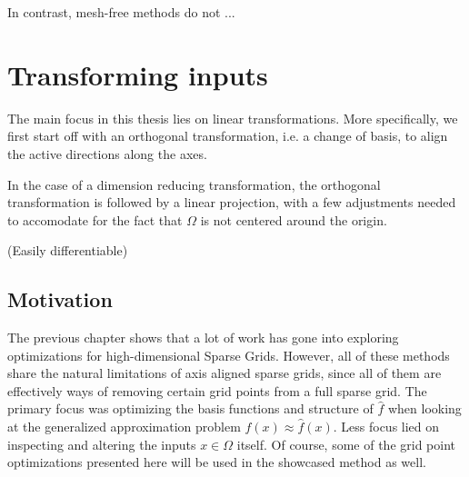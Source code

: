 \documentclass[
  a4paper,  %
  twoside,  %
  bibliography=totoc,
  headsepline,
  cleardoublepage=empty,
  parskip=half,
  draft=false
]{scrbook}
\begin{document}
In contrast, mesh-free methods do not ...







\chapter{Transforming inputs}

The main focus in this thesis lies on linear transformations.
More specifically, we first start off with an orthogonal transformation, i.e. a change of basis, to align the active directions along the axes.

In the case of a dimension reducing transformation, the orthogonal transformation is followed by a linear projection, with a few adjustments needed to accomodate for the fact that $\Omega$ is not centered around the origin. 

(Easily differentiable)

\section{Motivation}


The previous chapter shows that a lot of work has gone into exploring optimizations for high-dimensional Sparse Grids.
However, all of these methods share the natural limitations of axis aligned sparse grids, since all of them are effectively ways of removing certain grid points from a full sparse grid.
The primary focus was optimizing the basis functions and structure of $\hat{f}$ when looking at the generalized approximation problem $f(x) \approx \hat{f}(x)$.
Less focus lied on inspecting and altering the inputs $x \in \Omega$ itself.
Of course, some of the grid point optimizations presented here will be used in the showcased method as well.
\end{document}

